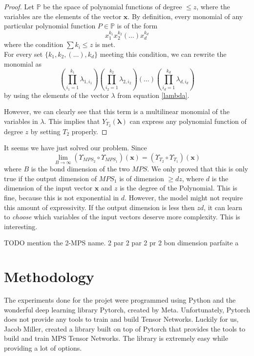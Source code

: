 \documentclass{article}
\theoremstyle{definition}
\theoremstyle{definition}
\begin{document}
\begin{proof}
Let $\mathbb{P}$ be the space of polynomial functions 
of degree $\leq z$, where the variables are the elements of the vector $\mathbf{x}$. By definition, every monomial of any particular polynomial function $P \in \mathbb{P}$ is of the form
\begin{equation}
    x_{1}^{k_1}x_{2}^{k_2}(\dots)x_{d}^{k_d}
\end{equation}
where the condition $\sum k_i \leq z$ is met. \\
For every set $\{k_1, k_2, (\dots), k_d\}$ meeting this condition,
we can rewrite the monomial as
\begin{equation}
    \left( \prod_{i_1=1}^{k_1}\lambda_{1, i_1} \right)
    \left( \prod_{i_2=1}^{k_2}\lambda_{2, i_2} \right)
    \left( \dots \right)
    \left( \prod_{i_d=1}^{k_d}\lambda_{d, i_d} \right)
\end{equation}
by using the elements of the vector $\lambda$ from equation \eqref{lambda}.

However, we can clearly see that this term is a multilinear 
monomial of the variables in $\lambda$. This implies that
$Y_{T_2}(\bm{\lambda})$ can express any polynomial function of degree $z$ by setting $T_2$ properly.





\end{proof}
It seems we have just solved our problem. Since
\[
    \lim_{B\to\infty}
    \left(\Upsilon_{MPS_2} \circ \Upsilon_{MPS_1}\right) (\mathbf{x})
    =
    \left(\Upsilon_{T_2} \circ \Upsilon_{T_1}\right) (\mathbf{x})
\]
where $B$ is the bond dimension of the two $MPS$.
We only proved that this is only true if the output dimension of $MPS_1$ is of dimension $\geq dz$, where $d$ is the dimension of the input vector $\mathbf{x}$ and $z$ is the degree of the Polynomial. This is fine, because this is not exponential in $d$. However, the model might not require this amount of expressivity. If the output dimension is less then $zd$, it can learn to \emph{choose} which variables of the input vectors deserve more complexity. This is interesting.


TODO mention the 2-MPS name.
2 par 2 par 2 pr 2
bon dimension parfaite a 


\section{Methodology}
The experiments done for the projet were programmed using Python and the wonderful deep learning library Pytorch, created by Meta.
Unfortunately, Pytorch does not provide any tools to train and build Tensor Networks. 
Luckily for us, Jacob Miller, created a library \cite{torchmps} built on top of Pytorch that provides the tools to build and train MPS Tensor Networks. The library is extremely easy while providing a lot of options.
\end{document}
